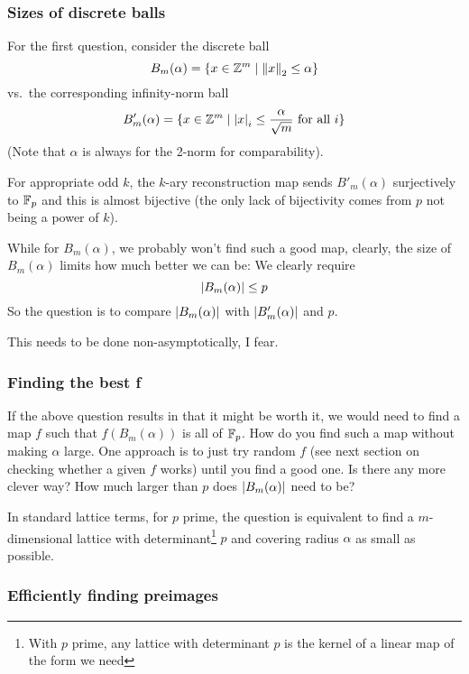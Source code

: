 \documentclass{article}
\begin{document}
\subsubsection{Sizes of discrete balls}
For the first question, consider the discrete ball
\[
 B_m(\alpha) = \{x \in {\mathbb{Z}}^m \mid {\lVert{x}\rVert}_2 \leq \alpha\}
\]
vs.\ the corresponding infinity-norm ball
\[
 B'_m(\alpha) = \{x \in {\mathbb{Z}}^m \mid {\lvert{x}\rvert}_i\leq \frac{\alpha}{\sqrt{m}}\ \text{for all}\ i \}
\]
(Note that $\alpha$ is always for the 2-norm for comparability).

For appropriate odd $k$, the $k$-ary reconstruction map sends $B'_m(\alpha)$ surjectively to ${\mathbb{F}}_p$ and this is almost bijective (the only lack of bijectivity comes from $p$ not being a power of $k$).

While for $B_m(\alpha)$, we probably won't find such a good map, clearly, the size of $B_m(\alpha)$ limits how much better we can be: We clearly require \[
{\lvert{B_m(\alpha)}\rvert} \leq p
\]
So the question is to compare ${\lvert{B_m(\alpha)}\rvert}$ with ${\lvert{B'_m(\alpha)}\rvert}$ and $p$.

This needs to be done non-asymptotically, I fear.
\subsubsection{Finding the best f}
If the above question results in that it might be worth it, we would need to find a map $f$ such that $f(B_m(\alpha))$ is all of ${\mathbb{F}}_p$. How do you find such a map without making $\alpha$ large.
One approach is to just try random $f$ (see next section on checking whether a given $f$ works) until you find a good one. Is there any more clever way? How much larger than $p$ does ${\lvert{B_m(\alpha)}\rvert}$ need to be?

In standard lattice terms, for $p$ prime, the question is equivalent to find a $m$-dimensional lattice with determinant\footnote{With $p$ prime, any lattice with determinant $p$ is the kernel of a linear map of the form we need} $p$ and covering radius $\alpha$ as small as possible.

\subsubsection{Efficiently finding preimages}
\end{document}
